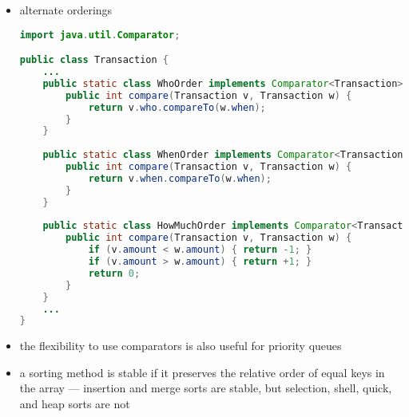 \documentclass[8pt,a4paper,compress]{beamer}
\begin{document}
\begin{frame}[fragile]
\begin{itemize}
\item alternate orderings
\begin{lstlisting}[language=Java]
import java.util.Comparator;

public class Transaction {  
    ...
    public static class WhoOrder implements Comparator<Transaction> {
        public int compare(Transaction v, Transaction w) { 
            return v.who.compareTo(w.when); 
        }        
    }
    
    public static class WhenOrder implements Comparator<Transaction> {
        public int compare(Transaction v, Transaction w) { 
            return v.when.compareTo(w.when); 
        }
    }
    
    public static class HowMuchOrder implements Comparator<Transaction> {
        public int compare(Transaction v, Transaction w) {
            if (v.amount < w.amount) { return -1; }
            if (v.amount > w.amount) { return +1; }
            return 0;
        }
    }
    ...
}
\end{lstlisting}

\item the flexibility to use comparators is also useful for priority queues

\item a sorting method is stable if it preserves the relative order of equal keys in the array --- insertion and merge sorts are stable, but selection, shell, quick, and heap sorts are not
\end{itemize}
\end{frame}
\end{document}
